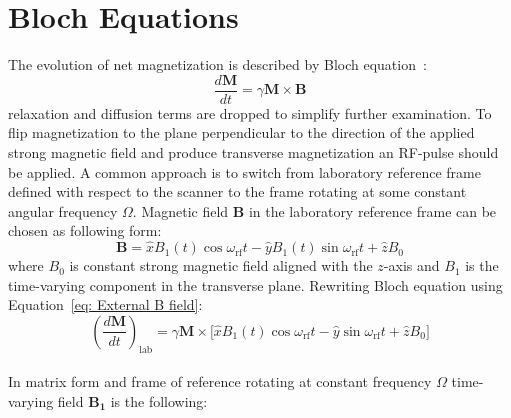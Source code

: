 \section{Bloch Equations}
The evolution of net magnetization is described by Bloch equation~\cite{Bloch1946}:
\begin{equation}\label{eq: Bloch equation}
	\frac{d\mathbf{M}}{dt}=\gamma\mathbf{M} \times \mathbf{B}
\end{equation}
relaxation and diffusion terms are dropped to simplify further examination. To flip magnetization to the plane perpendicular to the direction of the applied strong magnetic field and produce transverse magnetization an RF-pulse should be applied. A common approach is to switch from laboratory reference frame defined with respect to the scanner to the frame rotating at some constant angular frequency $\Omega$. Magnetic field $\mathbf{B}$ in the laboratory reference frame can be chosen as following form:
\begin{equation}\label{eq: External B field}
	\mathbf{B}=\hat{x}B_{1}(t)\cos{\omega_{\text{rf}} t}-\hat{y}B_{1}(t)\sin{\omega_{\text{rf}} t} +\hat{z}B_0
\end{equation}
where $B_0$ is constant strong magnetic field aligned with the $z$-axis and $B_1$ is the time-varying component in the transverse plane. 
Rewriting Bloch equation using Equation~\ref{eq: External B field}:
\begin{equation}\label{eq: Bloch equation lab frame}
\left(\frac{d\mathbf{M}}{dt}\right)_{\text{lab}}=\gamma\mathbf{M}\times\biggl[\hat{x}B_1(t)\cos{\omega_{\text{rf}}t}-\hat{y}\sin{\omega_{\text{rf}}t}+\hat{z}B_0\biggr]
\end{equation}\\
In matrix form and frame of reference rotating at constant frequency $\Omega$ time-varying field $\mathbf{B_{1}}$ is the following:
